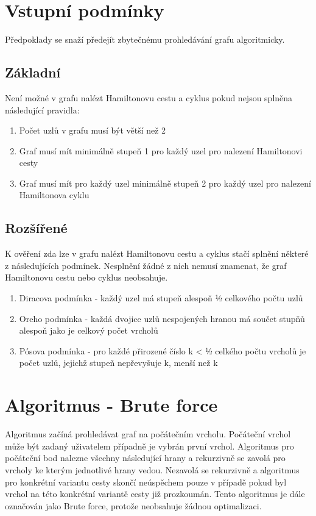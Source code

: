 \documentclass[a4paper,11pt]{article}
\begin{document}
\section{Vstupní podmínky}

Předpoklady se snaží předejít zbytečnému prohledávání grafu algoritmicky.

\subsection{Základní}

Není možné v grafu nalézt Hamiltonovu cestu a cyklus pokud nejsou splněna následující pravidla:
\begin{enumerate}
	\item Počet uzlů v grafu musí být větší než 2
	\item Graf musí mít minimálně stupeň 1 pro každý uzel pro nalezení Hamiltonovi cesty
    \item Graf musí mít pro každý uzel minimálně stupeň 2 pro každý uzel pro nalezení Hamiltonova cyklu
\end{enumerate}

\subsection{Rozšířené}

K ověření zda lze v grafu nalézt Hamiltonovu cestu a cyklus stačí splnění některé z následujících podmínek. Nesplnění žádné z nich nemusí znamenat, že graf Hamiltonovu cestu nebo cyklus neobsahuje.

\begin{enumerate}
    \item Diracova podmínka - každý uzel má stupeň alespoň ½ celkového počtu uzlů
    \item Oreho podmínka - každá dvojice uzlů nespojených hranou má součet stupňů alespoň jako je celkový počet vrcholů
    \item Pósova podmínka - pro každé přirozené číslo k < ½ celkého počtu vrcholů je počet uzlů, jejichž stupeň nepřevyšuje k, menší než k
\end{enumerate}

\section{Algoritmus - Brute force}

Algoritmus začíná prohledávat graf na počátečním vrcholu. Počáteční vrchol může být zadaný uživatelem případně je vybrán první vrchol. Algoritmus pro počáteční bod nalezne všechny následující hrany a rekurzivně se zavolá pro vrcholy ke kterým jednotlivé hrany vedou. Nezavolá se rekurzivně a algoritmus pro konkrétní variantu cesty skončí neúspěchem pouze v případě pokud byl vrchol na této konkrétní variantě cesty již prozkoumán. Tento algoritmus je dále označován jako Brute force, protože neobsahuje žádnou optimalizaci.
\end{document}
